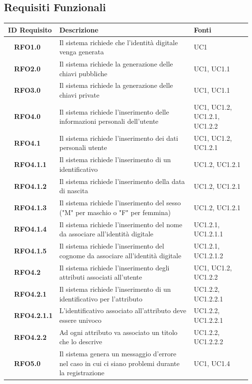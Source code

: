 \subsection{Requisiti Funzionali}
\begin{longtable}{|r l|p{10cm}|p{2cm}|}
	\hline
	\multicolumn{2}{|c|}{\textbf{ID Requisito}} & \textbf{Descrizione} & \textbf{Fonti}\tabularnewline
	\hline
	&\textbf{RFO1.0}&Il sistema richiede che l'identità digitale venga generata&UC1 \\\hline
	&\textbf{RFO2.0}&Il sistema richiede la generazione delle chiavi pubbliche&UC1, UC1.1 \\\hline
	&\textbf{RFO3.0}&Il sistema richiede la generazione delle chiavi private&UC1, UC1.1 \\\hline
	&\textbf{RFO4.0}&Il sistema richiede l'inserimento delle informazioni personali dell'utente&UC1, UC1.2, UC1.2.1, UC1.2.2 \\\hline
	&\textbf{RFO4.1}&Il sistema richiede l'inserimento dei dati personali utente&UC1, UC1.2, UC1.2.1 \\\hline
	&\textbf{RFO4.1.1}&Il sistema richiede l'inserimento di un identificativo&UC1.2, UC1.2.1 \\\hline
	&\textbf{RFO4.1.2}&Il sistema richiede l'inserimento della data di nascita&UC1.2, UC1.2.1 \\\hline
	&\textbf{RFO4.1.3}&Il sistema richiede l'inserimento del sesso ("M" per maschio o "F" per femmina)&UC1.2, UC1.2.1\\\hline
	&\textbf{RFO4.1.4}&Il sistema richiede l'inserimento del nome da associare all'identità digitale&UC1.2.1, UC1.2.1.1\\\hline
	&\textbf{RFO4.1.5}&Il sistema richiede l'inserimento del cognome da associare all'identità digitale&UC1.2.1, UC1.2.1.2\\\hline
	&\textbf{RFO4.2}&Il sistema richiede l'inserimento degli attributi associati all'utente&UC1, UC1.2, UC1.2.2 \\\hline
	&\textbf{RFO4.2.1}&Il sistema richiede l'inserimento di un identificativo per l'attributo&UC1.2.2, UC1.2.2.1 \\\hline
	&\textbf{RFO4.2.1.1}& L'identificativo associato all'attributo deve essere univoco&UC1.2.2, UC1.2.2.1 \\\hline
	&\textbf{RFO4.2.2}&Ad ogni attributo va associato un titolo che lo descrive&UC1.2.2, UC1.2.2.2 \\\hline
	&\textbf{RFO5.0}&Il sistema genera un messaggio d'errore nel caso in cui ci siano problemi durante la registrazione&UC1, UC1.4 \\\hline

\end{longtable}
